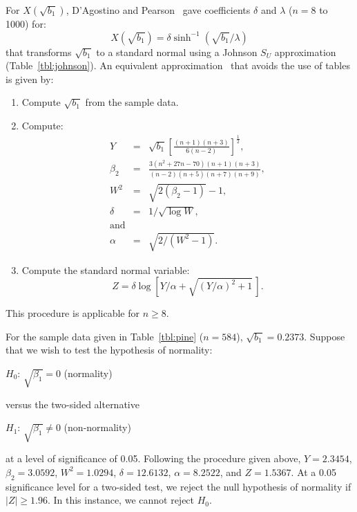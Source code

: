 \documentclass[draft]{article}
\newenvironment{example}{%
   \vspace{\baselineskip}
   \par\noindent\hrulefill\par
   \noindent{\em Example:}}{%
   \par\noindent\hrulefill\par
   \vspace{\baselineskip}}
\begin{document}
For \(X\left(\sqrt{b_1}\right)\), D'Agostino and 
Pearson~\cite{dagostino73} gave coefficients \(\delta\)
and \(\lambda\) (\(n=8\) to 1000) for:
\begin{equation}
X\left(\sqrt{b_1}\right) = \delta \sinh^{-1}
\left(\sqrt{b_1}/\lambda\right)
\end{equation}
that transforms \(\sqrt{b_1}\) to a standard normal
using a Johnson \(S_U\) approximation (Table~\ref{tbl:johnson}).
\label{sec:johnson-su}
An equivalent approximation~\cite{dagostino86} 
that avoids the use of tables is given by:
\begin{enumerate}
\item Compute \(\sqrt{b_1}\) from the sample data.
\item Compute:
\begin{eqnarray}
Y &=& \sqrt{b_1} \left[\frac{\left(n+1\right)\left(n+3\right)}
                         {6\left(n-2\right)}\right]^{\frac{1}{2}}, \\
\beta_2 &=& \frac{3\left(n^2+27n-70\right)\left(n+1\right)\left(n+3\right)}
        {\left(n-2\right)\left(n+5\right)\left(n+7\right)\left(n+9\right)},\\
W^2 &=& \sqrt{2\left(\beta_2-1\right)}-1, \\
\delta &=& 1/\sqrt{\log W}, \\
\mbox{and}\\
\alpha &=& \sqrt{2/\left(W^2-1\right)}.
\end{eqnarray}
\item Compute the standard normal variable:
\begin{equation}
Z = \delta \log\left[Y/\alpha + \sqrt{\left(Y/\alpha\right)^2+1}\,\right].
\end{equation}
\end{enumerate}
This procedure is applicable for \(n\ge8\).


\begin{example}
For the sample data given in Table~\ref{tbl:pine} (\(n=584\)), 
\(\sqrt{b_1} = 0.2373\).  Suppose that we wish to test the
hypothesis of normality:

\(H_0\): \(\sqrt{\beta_1}=0\) (normality)

\noindent versus the two-sided alternative

\(H_1\): \(\sqrt{\beta_1}\ne0\) (non-normality)

\noindent at a level of significance of 0.05.
Following the procedure given above,
\(Y =2.3454\), 
\(\beta_2 = 3.0592\),
\(W^2 = 1.0294\),
\(\delta=12.6132\),
\(\alpha=8.2522\), and
\(Z=1.5367\).
At a 0.05 significance level for a two-sided test, we reject
the null hypothesis of normality if \(\left|Z\right|\ge1.96\). In
this instance, we cannot reject \(H_0\).
\end{example}
\end{document}
